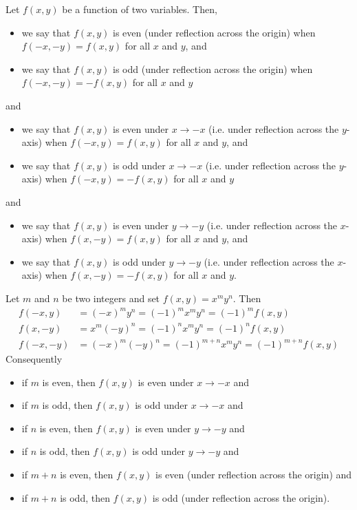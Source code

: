 \begin{defn}\label{def_evenodd_two_variables}
  Let $f(x,y)$ be a function of two variables. Then,
 \begin{itemize}
  \item we say that $f(x,y)$ is even (under reflection across the origin) 
    when $f(-x,-y)=f(x,y)$ for all $x$ and $y$, and
  \item we say that $f(x,y)$ is odd (under reflection across the origin) 
     when $f(-x,-y)=-f(x,y)$ for all $x$ and $y$
 \end{itemize}
and
 \begin{itemize}
  \item we say that $f(x,y)$ is even under $x\rightarrow -x$ (i.e. under           
         reflection across the $y$-axis) when $f(-x,y)=f(x,y)$ for all $x$ 
         and $y$, and
  \item we say that $f(x,y)$ is odd  under $x\rightarrow -x$ (i.e. under           
         reflection across the $y$-axis) when $f(-x,y)=-f(x,y)$ for all $x$ 
         and $y$
 \end{itemize}
and
 \begin{itemize}
  \item we say that $f(x,y)$ is even under $y\rightarrow -y$ (i.e. under           
         reflection across the $x$-axis) when $f(x,-y)=f(x,y)$ for all $x$ 
         and $y$, and
  \item we say that $f(x,y)$ is odd  under $y\rightarrow -y$ (i.e. under           
         reflection across the $x$-axis) when $f(x,-y)=-f(x,y)$ for all $x$ 
         and $y$.
 \end{itemize}
\end{defn}

\begin{eg}\label{eg_evenodd_two_variables}
Let $m$ and $n$ be two integers and set $f(x,y)=x^m y^n$. Then
\begin{align*}
f(-x,y)&= (-x)^my^n = (-1)^m x^m y^n = (-1)^m f(x,y) \\
f(x,-y)&= x^m(-y)^n = (-1)^n x^m y^n= (-1)^n f(x,y) \\
f(-x,-y)&= (-x)^m(-y)^n = (-1)^{m+n} x^m y^n = (-1)^{m+n} f(x,y) 
\end{align*}
Consequently
\begin{itemize}
\item if $m$ is even, then $f(x,y)$ is even under $x\rightarrow -x$ and
\item if $m$ is odd, then $f(x,y)$ is odd under $x\rightarrow -x$ and
\item if $n$ is even, then $f(x,y)$ is even under $y\rightarrow -y$ and
\item if $n$ is odd, then $f(x,y)$ is odd under $y\rightarrow -y$ and
\item if $m+n$ is even, then $f(x,y)$ is even  (under reflection across the origin) and
\item if $m+n$ is odd, then $f(x,y)$ is odd  (under reflection across the origin).
\end{itemize}
\end{eg}

